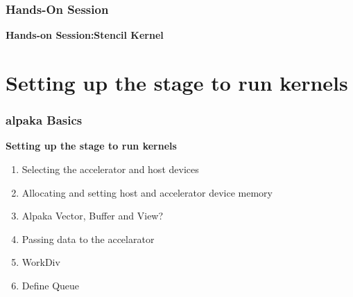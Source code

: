 \documentclass[9pt]{beamer}
\begin{document}




\begin{frame}
\frametitle{Hands-On Session}
\begin{center}
      \Huge \textbf{Hands-on Session:Stencil Kernel}
  \end{center}
\end{frame}

\section{Setting up the stage to run kernels}

\begin{frame}
\frametitle{alpaka Basics }
\begin{center}
      \Huge \textbf{Setting up the stage to run kernels}
  \end{center}
\begin{enumerate}
 \item Selecting the accelerator and host devices
 \item Allocating and setting host and accelerator device memory
 \item Alpaka Vector, Buffer and View?
 \item Passing data to the accelarator
 \item WorkDiv
 \item Define Queue
\end{enumerate}
    \end{frame}
\end{document}
